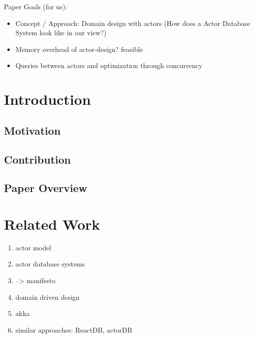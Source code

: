 
Paper Goals (for us):
\begin{itemize}
  \item Concept / Approach: Domain design with actors (How does a Actor Database System look like in our view?)
  \item Memory overhead of actor-design? feasible
  \item Queries between actors and optimization through concurrency
\end{itemize}
        
\section{Introduction}\label{sec:intro}
  \subsection{Motivation}
  

  \subsection{Contribution}

  \subsection{Paper Overview}

\section{Related Work}
\begin{enumerate}
  \item actor model
  \item actor database systems
  \item --> manifesto
  \item domain driven design
  \item akka
  \item similar approaches: ReactDB, actorDB
\end{enumerate}

